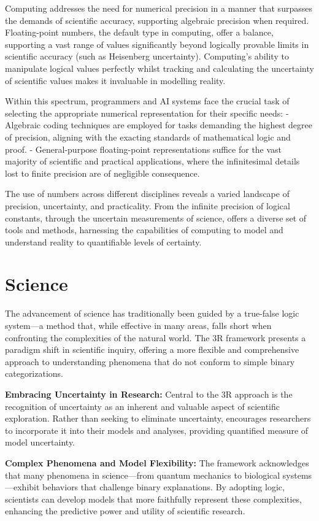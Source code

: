 \documentclass[12pt]{article}
\begin{document}
Computing addresses the need for numerical precision in a manner that surpasses the demands of scientific accuracy, supporting algebraic precision when required. Floating-point numbers, the default type in computing, offer a balance, supporting a vast range of values significantly beyond logically provable limits in scientific accuracy (such as Heisenberg uncertainty). Computing's ability to manipulate logical values perfectly whilst tracking and calculating the uncertainty of scientific values makes it invaluable in modelling reality.

Within this spectrum, programmers and AI systems face the crucial task of selecting the appropriate numerical representation for their specific needs:
- Algebraic coding techniques are employed for tasks demanding the highest degree of precision, aligning with the exacting standards of mathematical logic and proof.
- General-purpose floating-point representations suffice for the vast majority of scientific and practical applications, where the infinitesimal details lost to finite precision are of negligible consequence.

The use of numbers across different disciplines reveals a varied landscape of precision, uncertainty, and practicality. From the infinite precision of logical constants, through the uncertain measurements of science, \iR{} offers a diverse set of tools and methods, harnessing the capabilities of computing to model and understand reality to quantifiable levels of certainty.

\section*{Science}
The advancement of science has traditionally been guided by a true-false logic system—a method that, while effective in many areas, falls short when confronting the complexities of the natural world. The 3R framework presents a paradigm shift in scientific inquiry, offering a more flexible and comprehensive approach to understanding phenomena that do not conform to simple binary categorizations.

\textbf{Embracing Uncertainty in Research:} Central to the 3R approach is the recognition of uncertainty as an inherent and valuable aspect of scientific exploration. Rather than seeking to eliminate uncertainty, \qbit{} encourages researchers to incorporate it into their models and analyses, providing quantified measure of model uncertainty.

\textbf{Complex Phenomena and Model Flexibility:} The framework acknowledges that many phenomena in science—from quantum mechanics to biological systems—exhibit behaviors that challenge binary explanations. By adopting \qbit{} logic, scientists can develop models that more faithfully represent these complexities, enhancing the predictive power and utility of scientific research.
\end{document}
